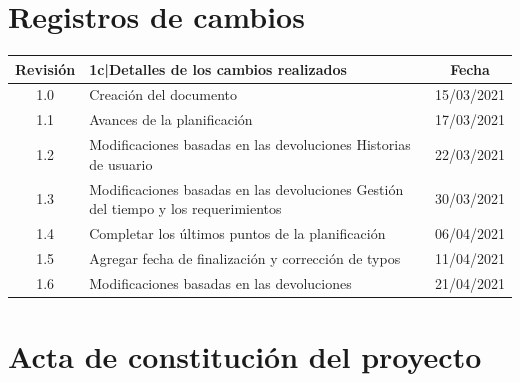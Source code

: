 \documentclass[11pt]{charter}
\begin{document}
\maketitle
\thispagestyle{empty}
\pagebreak


\thispagestyle{empty}
{\setlength{\parskip}{0pt}
\tableofcontents{}
}
\pagebreak


\section{Registros de cambios}
\label{sec:registro}


\begin{table}[ht]
\label{tab:registro}
\centering
\begin{tabularx}{\linewidth}{@{}|c|X|c|@{}}
\hline
\rowcolor[HTML]{C0C0C0} 
Revisión & {1}{c|}{\cellcolor[HTML]{C0C0C0}Detalles de los cambios realizados} & Fecha      \\ \hline
1.0      & Creación del documento                                          & 15/03/2021 \\ \hline
1.1      & Avances de la planificación & 17/03/2021 \\ \hline
1.2      & Modificaciones basadas en las devoluciones \newline
		   Historias de usuario											   & 22/03/2021 \\ \hline
1.3      & Modificaciones basadas en las devoluciones \newline
		   Gestión del tiempo y los requerimientos								   & 30/03/2021 \\ \hline
1.4      & Completar los últimos puntos de la planificación & 06/04/2021 \\ \hline
1.5      & Agregar fecha de finalización y corrección de typos & 11/04/2021 \\ \hline
1.6      & Modificaciones basadas en las devoluciones & 21/04/2021 \\ \hline
\end{tabularx}
\end{table}

\pagebreak



\section{Acta de constitución del proyecto}
\label{sec:acta}
\end{document}
